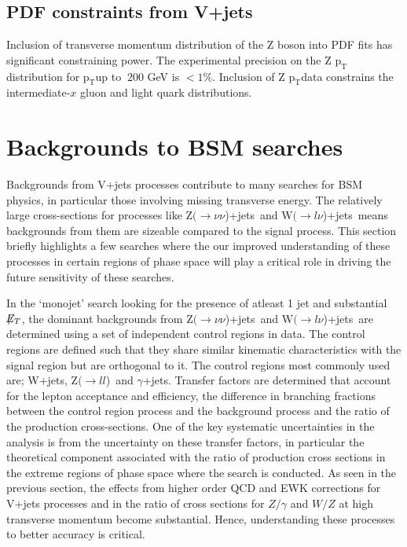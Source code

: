 \documentclass[a4paper,11pt,notoc]{article}
\newcommand{\Zll}   {\mbox{${\mathrm Z}(\rightarrow l l$)}}
\newcommand{\Znunuj}   {\mbox{${\mathrm Z}(\rightarrow\nu \nu$)+jets}}
\newcommand{\Wlnuj}   {\mbox{${\mathrm W}(\rightarrow l\nu$)+jets}}
\newcommand{\pt}{\ensuremath{\mathrm{p_T}}}
\newcommand{\met}{\ensuremath{\not\!\!E_T}}
\begin{document}
\subsection{PDF constraints from V+jets}
Inclusion of transverse momentum distribution of the Z boson into PDF fits has significant constraining power. The experimental precision on the Z \pt distribution for \pt up to $~ 200 $ GeV is $< 1\%$. Inclusion of Z \pt data constrains the intermediate-$x$ gluon and light quark distributions. 
\section{Backgrounds to BSM searches}
Backgrounds from V+jets processes contribute to many searches for BSM physics, in particular those involving missing transverse energy. The relatively large cross-sections for processes like \Znunuj\ and \Wlnuj\ means backgrounds from them are sizeable compared to the signal process. This section briefly highlights a few searches where the our improved understanding of these processes in certain regions of phase space will play a critical role in driving the future sensitivity of these searches. 

In the `monojet' search looking for the presence of atleast 1 jet and substantial \met, the dominant backgrounds from \Znunuj\ and \Wlnuj\ are determined using a set of independent control regions in data. The control regions are defined such that they share similar kinematic characteristics with the signal region but are orthogonal to it. The control regions most commonly used are; W+jets, \Zll\ and $\gamma$+jets. Transfer factors are determined that account for the lepton acceptance and efficiency, the difference in branching fractions between the control region process and the background process and the ratio of the production cross-sections. One of the key systematic uncertainties in the analysis is from the uncertainty on these transfer factors, in particular the theoretical component associated with the ratio of production cross sections in the extreme regions of phase space where the search is conducted. As seen in the previous section, the effects from higher order QCD and EWK corrections for V+jets processes and in the ratio of cross sections for $Z/\gamma$ and $W/Z$ at high transverse momentum become substantial. Hence, understanding these processes to better accuracy is critical.
\end{document}
